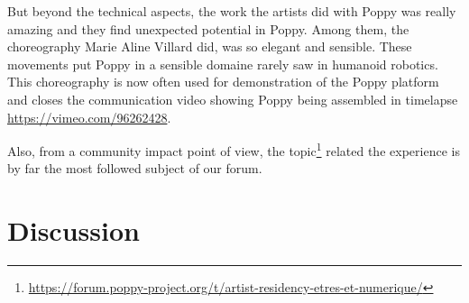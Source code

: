 But beyond the technical aspects, the work the artists did with Poppy was really amazing and they find unexpected potential in Poppy. Among them, the choreography Marie Aline Villard did, was so elegant and sensible. These movements put Poppy in a sensible domaine rarely saw in humanoid robotics. This choreography is now often used for demonstration of the Poppy platform and closes the communication video showing Poppy being assembled in timelapse \url{https://vimeo.com/96262428}.

Also, from a community impact point of view, the topic\footnote{\url{https://forum.poppy-project.org/t/artist-residency-etres-et-numerique/}} related the experience is by far the most followed subject of our forum.

\section{Discussion} %



